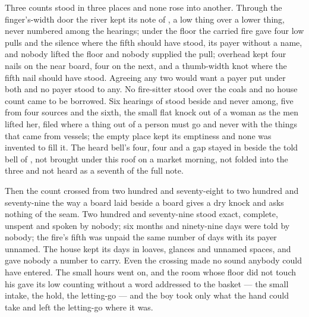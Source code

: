 Three counts stood in three places and none rose into another. Through the finger's-width door the river kept its note of , a low thing over a lower thing, never numbered among the hearings; under the floor the carried fire gave four low pulls and the silence where the fifth should have stood, its payer without a name, and nobody lifted the floor and nobody supplied the pull; overhead  kept four nails on the near board, four on the next, and a thumb-width knot where the fifth nail should have stood. Agreeing any two would want a payer put under both and no payer stood to any. No fire-sitter stood over the coals and no house count came to be borrowed. Six hearings of  stood beside and never among, five from four sources and the sixth, the small flat knock out of a woman as the men lifted her, filed where a thing out of a person must go and never with the things that came from vessels; the empty place kept its emptiness and none was invented to fill it. The heard bell's four, four and a gap stayed in  beside the told bell of , not brought under this roof on a market morning, not folded into the three and not heard as a seventh of the full note.

Then the count crossed from two hundred and seventy-eight to two hundred and seventy-nine the way a board laid beside a board gives a dry knock and asks nothing of the seam. Two hundred and seventy-nine stood exact, complete, unspent and spoken by nobody; six months and ninety-nine days were told by nobody; the fire's fifth was unpaid the same number of days with its payer unnamed. The house kept its days in loaves, glances and unnamed spaces, and gave nobody a number to carry. Even the crossing made no sound anybody could have entered. The small hours went on, and the room whose floor did not touch his gave its low counting without a word addressed to the basket --- the small intake, the hold, the letting-go --- and the boy took only what the hand could take and left the letting-go where it was.

